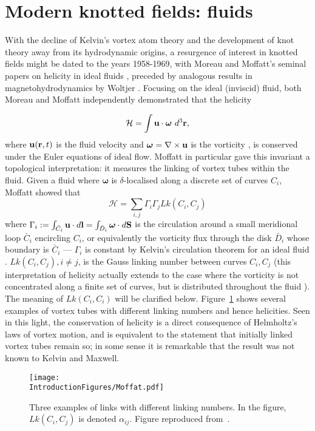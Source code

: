 \section{Modern knotted fields: fluids}
\label{sec:Fluids}
With the decline of Kelvin's vortex atom theory and the development of knot theory away from its hydrodynamic origins, a resurgence of interest in knotted fields might be dated to the years 1958-1969, with Moreau and Moffatt's seminal papers on helicity in ideal fluids \citep{Moreau1961,Moffatt1969}, preceded by analogous results in magnetohydrodynamics by Woltjer \citep{Woltjer1958}. Focusing on the ideal (inviscid) fluid, both Moreau and Moffatt independently demonstrated that the helicity

\begin{equation}
    \mathcal{H} = \int {\bf u} \cdot {\boldsymbol{\omega}} \ d^3 \bf r,
\end{equation}
where ${\bf u}({\bf r},t)$ is the fluid velocity and $\boldsymbol{\omega} = \nabla \times \bf u$ is the vorticity \citep{Saffman1992}, is conserved under the Euler equations of ideal flow. Moffatt in particular gave this invariant a topological interpretation: it measures the linking of vortex tubes within the fluid. Given a fluid where $\boldsymbol{\omega}$ is $\delta$-localised along a discrete set of curves $C_i$, Moffatt showed that
\begin{equation}
    \mathcal{H} = \sum_{i,j}\Gamma_i \Gamma_j  Lk(C_i,C_j) 
\label{eq:OriginalHelicity}
\end{equation}
where $\Gamma_i:= \int_{\bar{C}_i} {\bf u} \cdot d {\bf l} = \int_{\bar{D}_i} {\boldsymbol{\omega}}\cdot d{\bf S}$ is the circulation around a small meridional loop $\bar{C}_i$ encircling $C_i$, or equivalently the vorticity flux through the disk $\bar{D}_i$ whose boundary is $\bar{C}_i$ --- $\Gamma_i$ is constant by Kelvin's circulation theorem for an ideal fluid \citep{Moffatt1969}. $Lk(C_i,C_j), i\neq j$, is the Gauss linking number between curves $C_i, C_j$ (this interpretation of helicity actually extends to the case where the vorticity is not concentrated along a finite set of curves, but is distributed throughout the fluid \citep{Arnold1999}). The meaning of $Lk(C_i,C_i)$ will be clarified below. Figure~\ref{fig:Moffat} shows several examples of vortex tubes with different linking numbers and hence helicities. Seen in this light, the conservation of helicity is a direct consequence of Helmholtz's laws of vortex motion, and is equivalent to the statement that initially linked vortex tubes remain so; in some sense it is remarkable that the result was not known to Kelvin and Maxwell.
\begin{figure}[htbp]
\centering
\texttt{[image: \\IntroductionFigures/Moffat.pdf]}
\caption[Examples of links with different linking numbers.]{Three examples of links with different linking numbers. In the figure, $Lk(C_i,C_j)$ is denoted $\alpha_{ij}$. Figure reproduced from~\citep{Moffatt1969}.}
\label{fig:Moffat}
\end{figure}

